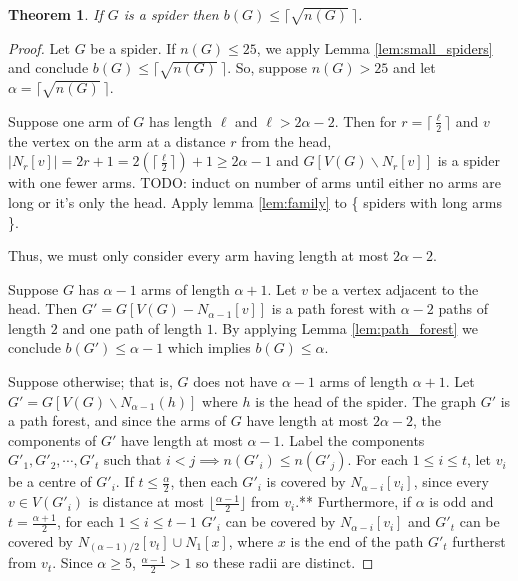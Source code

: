 \documentclass[12pt]{article}
\newtheorem{theorem}{Theorem}[section]
\begin{document}
\begin{theorem} \label{thm:main}
    If $G$ is a spider then $b(G) \leq \lceil \sqrt{n(G)}\ \rceil$.
\end{theorem}

\begin{proof}
    Let $G$ be a spider.
    If $n(G) \leq 25$, we apply Lemma \ref{lem:small_spiders} and conclude $b(G) \leq \lceil \sqrt{n(G)}\ \rceil$.
    So, suppose $n(G) > 25$ and let $\alpha = \lceil \sqrt{n(G)}\ \rceil$.

    Suppose one arm of $G$ has length $\ell$ and $\ell > 2\alpha - 2$.
    Then for $r = \lceil \frac{\ell}{2} \rceil$ and $v$ the vertex on the arm at a distance $r$ from the head, $|N_r[v]| = 2r + 1 = 2(\lceil \frac{\ell}{2} \rceil) + 1 \geq 2\alpha - 1$ and $G[V(G) \backslash N_r[v]]$ is a spider with one fewer arms.
    TODO: induct on number of arms until either no arms are long or it's only the head. Apply lemma \ref{lem:family} to \{ spiders with long arms \}.
    

    Thus, we must only consider every arm having length at most $2\alpha - 2$.
    
    Suppose $G$ has $\alpha - 1$ arms of length $\alpha + 1$.
    Let $v$ be a vertex adjacent to the head.
    Then $G' = G[V(G) - N_{\alpha - 1}[v]]$ is a path forest with $\alpha - 2$ paths of length $2$ and one path of length $1$.
    By applying Lemma \ref{lem:path_forest} we conclude $b(G') \leq \alpha - 1$ which implies $b(G) \leq \alpha$.

    Suppose otherwise; that is, $G$ does not have $\alpha - 1$ arms of length $\alpha + 1$.
    Let $G' = G[V(G) \backslash N_{\alpha-1}(h)]$ where $h$ is the head of the spider.
    The graph $G'$ is a path forest, and since the arms of $G$ have length at most $2\alpha - 2$, the components of $G'$ have length at most $\alpha - 1$.
    Label the components $G'_1, G'_2, \dotsb , G'_t$ such that $i < j \implies n(G'_i) \leq n(G'_j)$.
    For each $1 \leq i \leq t$, let $v_i$ be a centre of $G'_i$.
    If $t \leq \frac{\alpha}{2}$, then each $G'_i$ is covered by $N_{\alpha - i}[v_i]$, since every $v \in V(G'_i)$ is distance at most $\lfloor \frac{\alpha - 1}{2} \rfloor$ from $v_i$.** 
    Furthermore, if $\alpha$ is odd and $t = \frac{\alpha + 1}{2}$, for each $1 \leq i \leq t-1$ $G'_i$ can be covered by $N_{\alpha-i}[v_i]$ and $G'_{t}$ can be covered by $N_{(\alpha - 1) \slash 2}[v_t] \cup N_{1}[x]$, where $x$ is the end of the path $G'_t$ furtherst from $v_t$.
    Since $\alpha \geq 5$, $\frac{\alpha - 1}{2} > 1$ so these radii are distinct.


\end{proof}
\end{document}
